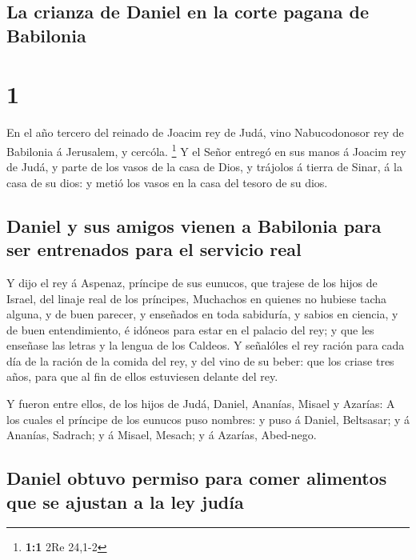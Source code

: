 \hypertarget{la-crianza-de-daniel-en-la-corte-pagana-de-babilonia}{%
\subsection{La crianza de Daniel en la corte pagana de
Babilonia}\label{la-crianza-de-daniel-en-la-corte-pagana-de-babilonia}}

\hypertarget{section}{%
\section{1}\label{section}}

 En el año tercero del reinado de Joacim rey de Judá, vino
Nabucodonosor rey de Babilonia á Jerusalem, y cercóla. \footnote{\textbf{1:1}
  2Re 24,1-2}  Y el Señor entregó en sus manos á Joacim rey
de Judá, y parte de los vasos de la casa de Dios, y trájolos á tierra de
Sinar, á la casa de su dios: y metió los vasos en la casa del tesoro de
su dios.

\hypertarget{daniel-y-sus-amigos-vienen-a-babilonia-para-ser-entrenados-para-el-servicio-real}{%
\subsection{Daniel y sus amigos vienen a Babilonia para ser entrenados
para el servicio
real}\label{daniel-y-sus-amigos-vienen-a-babilonia-para-ser-entrenados-para-el-servicio-real}}

 Y dijo el rey á Aspenaz, príncipe de sus eunucos, que
trajese de los hijos de Israel, del linaje real de los príncipes,
 Muchachos en quienes no hubiese tacha alguna, y de buen
parecer, y enseñados en toda sabiduría, y sabios en ciencia, y de buen
entendimiento, é idóneos para estar en el palacio del rey; y que les
enseñase las letras y la lengua de los Caldeos.  Y señalóles
el rey ración para cada día de la ración de la comida del rey, y del
vino de su beber: que los criase tres años, para que al fin de ellos
estuviesen delante del rey.

 Y fueron entre ellos, de los hijos de Judá, Daniel,
Ananías, Misael y Azarías:  A los cuales el príncipe de los
eunucos puso nombres: y puso á Daniel, Beltsasar; y á Ananías, Sadrach;
y á Misael, Mesach; y á Azarías, Abed-nego.

\hypertarget{daniel-obtuvo-permiso-para-comer-alimentos-que-se-ajustan-a-la-ley-juduxeda}{%
\subsection{Daniel obtuvo permiso para comer alimentos que se ajustan a
la ley
judía}\label{daniel-obtuvo-permiso-para-comer-alimentos-que-se-ajustan-a-la-ley-juduxeda}}

